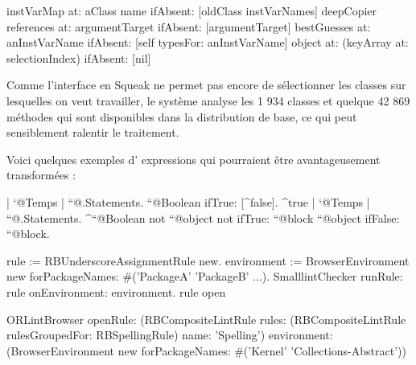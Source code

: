 \documentclass[a4paper,10pt,twoside]{book}
\begin{document}
\begin{code}{}
instVarMap at: aClass name ifAbsent: [oldClass instVarNames]
deepCopier references at: argumentTarget ifAbsent: [argumentTarget]
bestGuesses at: anInstVarName ifAbsent: [self typesFor: anInstVarName]
object at: (keyArray at: selectionIndex) ifAbsent: [nil]
\end{code}

Comme l'interface en Squeak ne permet pas encore de s\'electionner les
classes sur lesquelles on veut travailler, le syst\`eme analyse les 1
934 classes et quelque 42 869 m\'ethodes qui sont disponibles dans la
distribution de base, ce qui peut sensiblement ralentir le traitement.

Voici quelques exemples d'
expressions qui pourraient être avantageusement transform\'ees :

\begin{code}{}
| `@Temps | ``@.Statements. ``@Boolean ifTrue: [^false]. ^true
| `@Temps | ``@.Statements. ^``@Boolean not
``@object not ifTrue: ``@block
``@object ifFalse: ``@block.
\end{code}



\begin{code}{}
rule := RBUnderscoreAssignmentRule new.
environment := BrowserEnvironment new forPackageNames: \#('PackageA'
'PackageB' ...).
SmalllintChecker runRule: rule onEnvironment: environment.
rule open
\end{code}

\begin{code}{}
ORLintBrowser
	openRule: (RBCompositeLintRule rules: (RBCompositeLintRule
rulesGroupedFor: RBSpellingRule) name: 'Spelling')
	environment: (BrowserEnvironment new forPackageNames: \#('Kernel'
'Collections-Abstract'))
\end{code}
\end{document}
